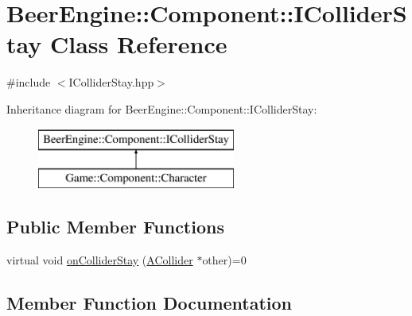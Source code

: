 \hypertarget{class_beer_engine_1_1_component_1_1_i_collider_stay}{}\section{Beer\+Engine\+:\+:Component\+:\+:I\+Collider\+Stay Class Reference}
\label{class_beer_engine_1_1_component_1_1_i_collider_stay}


{\ttfamily \#include $<$I\+Collider\+Stay.\+hpp$>$}

Inheritance diagram for Beer\+Engine\+:\+:Component\+:\+:I\+Collider\+Stay\+:\begin{figure}[H]
\begin{center}
\leavevmode
\includegraphics[height=2.000000cm]{class_beer_engine_1_1_component_1_1_i_collider_stay}
\end{center}
\end{figure}
\subsection*{Public Member Functions}
\begin{DoxyCompactItemize}
\item 
virtual void \mbox{\hyperlink{class_beer_engine_1_1_component_1_1_i_collider_stay_a462a0eb147235000265ed3f29d8b343e}{on\+Collider\+Stay}} (\mbox{\hyperlink{class_beer_engine_1_1_component_1_1_a_collider}{A\+Collider}} $\ast$other)=0
\end{DoxyCompactItemize}


\subsection{Member Function Documentation}
\mbox{\label{class_beer_engine_1_1_component_1_1_i_collider_stay_a462a0eb147235000265ed3f29d8b343e}} 
